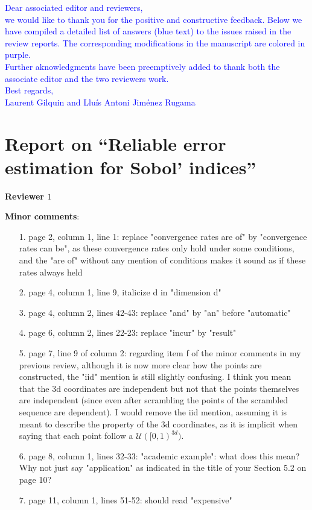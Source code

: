 \documentclass[10pt,a4paper]{article}
\begin{document}
\textcolor{blue}{Dear associated editor and reviewers,\\
we would like to thank you for the positive and constructive feedback. Below we have compiled a detailed list of answers (blue text) to the issues raised in the review reports. The corresponding modifications in the manuscript are colored in purple. \\
Further aknowledgments have been preemptively added to thank both the associate editor and the two reviewers work.\\
Best regards,\\
Laurent Gilquin and Llu\'{i}s Antoni Jim\'{e}nez Rugama}

\section*{Report on ``Reliable error estimation for Sobol' indices''}


\textbf{\large{Reviewer $1$}}
\vspace*{0.5cm}

\textbf{Minor comments}:

\begin{itemize}

\item[1.] page 2, column 1, line 1: replace "convergence rates are of" by "convergence rates can be", as these convergence rates only hold under some conditions, and the "are of" without any mention of conditions makes it sound as if these rates always held

\item[2.] page 4, column 1, line 9, italicize d in "dimension d"

\item[3.] page 4, column 2, lines 42-43: replace "and" by "an" before "automatic"

\item[4.] page 6, column 2, lines 22-23: replace "incur" by "result"

\item[5.] page 7, line 9 of column 2: regarding item f of the minor comments in my previous review, although it is now more clear how the points are constructed, the "iid" mention is still slightly confusing. I think you mean that the 3d coordinates are independent but not that the points themselves are independent (since even after scrambling the points of the scrambled sequence are dependent). I would remove the iid mention, assuming it is meant to describe the property of the 3d coordinates, as it is implicit when saying that each point follow a $\mathcal{U}([0,1)^{3d})$.

\item[6.] page 8, column 1, lines 32-33: "academic example": what does this mean? Why not just say "application" as indicated in the title of your Section 5.2 on page 10?

\item[7.] page 11, column 1, lines 51-52: should read "expensive"
\end{itemize}
\end{document}
